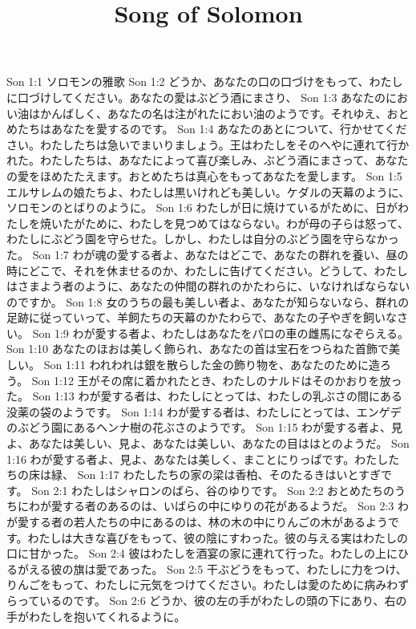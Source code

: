 

\title{Song of Solomon}

Son 1:1  ソロモンの雅歌
Son 1:2  どうか、あなたの口の口づけをもって、わたしに口づけしてください。あなたの愛はぶどう酒にまさり、
Son 1:3  あなたのにおい油はかんばしく、あなたの名は注がれたにおい油のようです。それゆえ、おとめたちはあなたを愛するのです。
Son 1:4  あなたのあとについて、行かせてください。わたしたちは急いでまいりましょう。王はわたしをそのへやに連れて行かれた。わたしたちは、あなたによって喜び楽しみ、ぶどう酒にまさって、あなたの愛をほめたたえます。おとめたちは真心をもってあなたを愛します。
Son 1:5  エルサレムの娘たちよ、わたしは黒いけれども美しい。ケダルの天幕のように、ソロモンのとばりのように。
Son 1:6  わたしが日に焼けているがために、日がわたしを焼いたがために、わたしを見つめてはならない。わが母の子らは怒って、わたしにぶどう園を守らせた。しかし、わたしは自分のぶどう園を守らなかった。
Son 1:7  わが魂の愛する者よ、あなたはどこで、あなたの群れを養い、昼の時にどこで、それを休ませるのか、わたしに告げてください。どうして、わたしはさまよう者のように、あなたの仲間の群れのかたわらに、いなければならないのですか。
Son 1:8  女のうちの最も美しい者よ、あなたが知らないなら、群れの足跡に従っていって、羊飼たちの天幕のかたわらで、あなたの子やぎを飼いなさい。
Son 1:9  わが愛する者よ、わたしはあなたをパロの車の雌馬になぞらえる。
Son 1:10  あなたのほおは美しく飾られ、あなたの首は宝石をつらねた首飾で美しい。
Son 1:11  われわれは銀を散らした金の飾り物を、あなたのために造ろう。
Son 1:12  王がその席に着かれたとき、わたしのナルドはそのかおりを放った。
Son 1:13  わが愛する者は、わたしにとっては、わたしの乳ぶさの間にある没薬の袋のようです。
Son 1:14  わが愛する者は、わたしにとっては、エンゲデのぶどう園にあるヘンナ樹の花ぶさのようです。
Son 1:15  わが愛する者よ、見よ、あなたは美しい、見よ、あなたは美しい、あなたの目ははとのようだ。
Son 1:16  わが愛する者よ、見よ、あなたは美しく、まことにりっぱです。わたしたちの床は緑、
Son 1:17  わたしたちの家の梁は香柏、そのたるきはいとすぎです。
Son 2:1  わたしはシャロンのばら、谷のゆりです。
Son 2:2  おとめたちのうちにわが愛する者のあるのは、いばらの中にゆりの花があるようだ。
Son 2:3  わが愛する者の若人たちの中にあるのは、林の木の中にりんごの木があるようです。わたしは大きな喜びをもって、彼の陰にすわった。彼の与える実はわたしの口に甘かった。
Son 2:4  彼はわたしを酒宴の家に連れて行った。わたしの上にひるがえる彼の旗は愛であった。
Son 2:5  干ぶどうをもって、わたしに力をつけ、りんごをもって、わたしに元気をつけてください。わたしは愛のために病みわずらっているのです。
Son 2:6  どうか、彼の左の手がわたしの頭の下にあり、右の手がわたしを抱いてくれるように。
